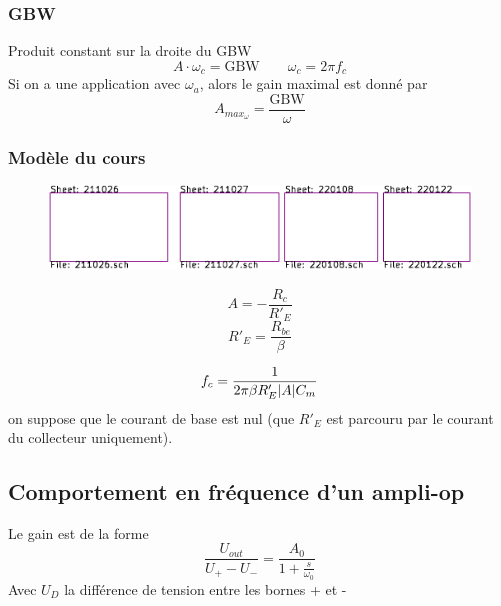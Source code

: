 \documentclass[resume]{subfiles}
\begin{document}
\begin{multicols}{3}
\subsubsection{GBW}
Produit constant sur la droite du GBW
$$A\cdot \omega_c = \text{GBW}\qquad \omega_c=2\pi f_c$$
Si on a une application avec $\omega_a$, alors le gain maximal est donné par
$$A_{max_\omega}=\frac{\text{GBW}}{\omega}$$
\subsubsection{Modèle du cours}
\begin{figure}[H]
\centering
\includegraphics[scale=1,page=10]{../KiCad/resume-crop.pdf}
\end{figure}
$$A=-\frac{R_c}{R'_E}$$
$$R'_E=\frac{R_{be}}{\beta}$$

$$f_c=\frac{1}{2\pi \beta R'_E \abs{A} C_m}$$
on suppose que le courant de base est nul (que $R'_E$ est parcouru par le courant du collecteur uniquement).
\subsection{Comportement en fréquence d'un ampli-op}
Le gain est de la forme
$$\boxed{\frac{U_{out}}{U_{+}-U_{-}}=\frac{A_0}{1+\frac{s}{\omega_0}}}$$
Avec $U_D$ la différence de tension entre les bornes + et -

\end{multicols}
\end{document}
